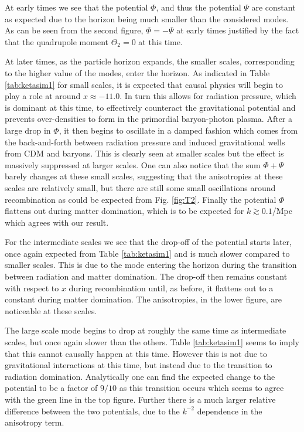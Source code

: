 \documentclass[%
reprint,
 amsmath,amssymb,
 aps,
]{revtex4-2}
\begin{document}
At early times we see that the potential $\Phi$, and thus the potential $\Psi$ are constant as expected due to the horizon being much smaller than the considered modes. As can be seen from the second figure, $\Phi=-\Psi$ at early times justified by the fact that the quadrupole moment $\Theta_2=0$ at this time.

At later times, as the particle horizon expands, the smaller scales, corresponding to the higher value of the modes, enter the horizon. As indicated in Table \ref{tab:ketasim1} for small scales, it is expected that causal physics will begin to play a role at around $x\approx -11.0$. In turn this allows for radiation pressure, which is dominant at this time, to effectively counteract the gravitational potential and prevents over-densities to form in the primordial baryon-photon plasma. After a large drop in $\Phi$, it then begins to oscillate in a damped fashion which comes from the back-and-forth between radiation pressure and induced gravitational wells from CDM and baryons. This is clearly seen at smaller scales but the effect is massively suppressed at larger scales. One can also notice that the sum $\Phi+\Psi$ barely changes at these small scales, suggesting that the anisotropies at these scales are relatively small, but there are still some small oscillations around recombination as could be expected from Fig. \ref{fig:T2}. Finally the potential $\Phi$ flattens out during matter domination, which is to be expected for $k\gtrsim0.1$/Mpc which agrees with our result. 

For the intermediate scales we see that the drop-off of the potential starts later, once again expected from Table \ref{tab:ketasim1} and is much slower compared to smaller scales. This is due to the mode entering the horizon during the transition between radiation and matter domination. The drop-off then remains constant with respect to $x$ during recombination until, as before, it flattens out to a constant during matter domination. The anisotropies, in the lower figure, are noticeable at these scales. 

The large scale mode begins to drop at roughly the same time as intermediate scales, but once again slower than the others. Table \ref{tab:ketasim1} seems to imply that this cannot causally happen at this time. However this is not due to gravitational interactions at this time, but instead due to the transition to radiation domination. Analytically one can find the expected change to the potential to be a factor of $9/10$ as this transition occurs \cite{AST5220LectureNotes} which seems to agree with the green line in the top figure. Further there is a much larger relative difference between the two potentials, due to the $k^{-2}$ dependence in the anisotropy term.
\end{document}
